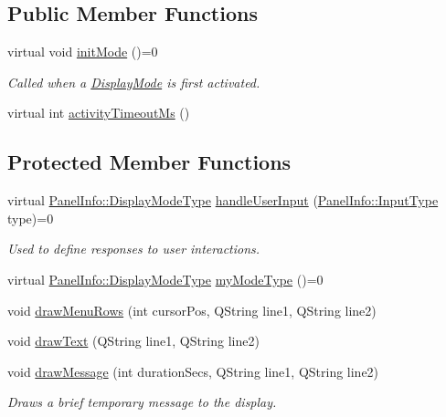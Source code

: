 \subsection*{Public Member Functions}
\begin{DoxyCompactItemize}
\item 
virtual void \hyperlink{class_display_mode_a08a30faa7bd878665185bd3451b5dc9d}{init\-Mode} ()=0
\begin{DoxyCompactList}\small\item\em Called when a \hyperlink{class_display_mode}{Display\-Mode} is first activated. \end{DoxyCompactList}\item 
virtual int \hyperlink{class_display_mode_a2f2ea0d9a32c080f341c159adfeafcfa}{activity\-Timeout\-Ms} ()
\end{DoxyCompactItemize}
\subsection*{Protected Member Functions}
\begin{DoxyCompactItemize}
\item 
virtual \hyperlink{namespace_panel_info_adb8b98e092c15e831aa524d39701d565}{Panel\-Info\-::\-Display\-Mode\-Type} \hyperlink{class_display_mode_a2cd062972909097648b40c08ff743ae8}{handle\-User\-Input} (\hyperlink{namespace_panel_info_aeeb3b627166cd15c3898f93a1a499c65}{Panel\-Info\-::\-Input\-Type} type)=0
\begin{DoxyCompactList}\small\item\em Used to define responses to user interactions. \end{DoxyCompactList}\item 
virtual \hyperlink{namespace_panel_info_adb8b98e092c15e831aa524d39701d565}{Panel\-Info\-::\-Display\-Mode\-Type} \hyperlink{class_display_mode_a1e7318ccee20933fbe6e1193aa0a19e7}{my\-Mode\-Type} ()=0
\item 
void \hyperlink{class_display_mode_a9a12e6ca60143d4e447479a36f44df5d}{draw\-Menu\-Rows} (int cursor\-Pos, Q\-String line1, Q\-String line2)
\item 
void \hyperlink{class_display_mode_a7f084ba9fa63656644ae736abed8902c}{draw\-Text} (Q\-String line1, Q\-String line2)
\item 
void \hyperlink{class_display_mode_a8aa3f4ab2efbcb2ff6988aa7befe4af0}{draw\-Message} (int duration\-Secs, Q\-String line1, Q\-String line2)
\begin{DoxyCompactList}\small\item\em Draws a brief temporary message to the display. \end{DoxyCompactList}\end{DoxyCompactItemize}



